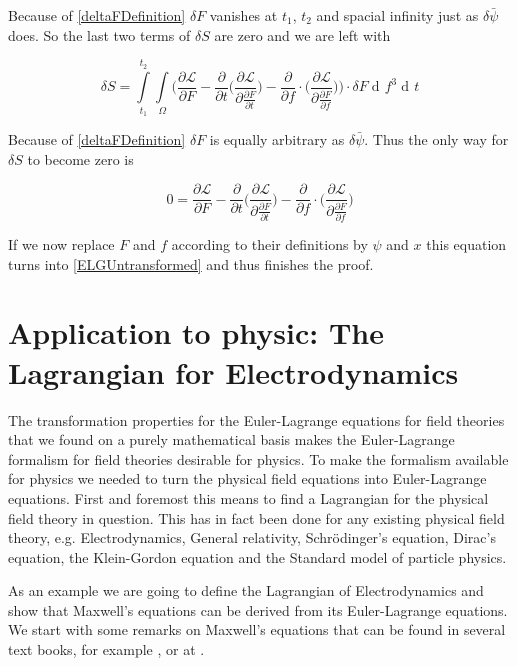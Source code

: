 \documentclass{article}
\DeclareMathOperator{\dd}{d\!}
\begin{document}
Because of \ref{deltaFDefinition}
$\delta F$ vanishes at $t_1$, $t_2$ and spacial infinity just as $\delta \bar{\psi}$ does. So the last two terms of $\delta S$ are zero and we are left with

\begin{equation}
\delta S = \int\limits_{t_1}^{t_2} \int\limits_{\Omega} 
\bigg(
\frac{\partial \mathcal{L}}{\partial F}
-\frac{\partial}{\partial t} \bigg( \frac{\partial \mathcal{L}}{\partial \frac{\partial F}{\partial t}} \bigg) 
-\frac{\partial}{\partial f} \cdot \bigg( \frac{\partial \mathcal{L}}{\partial \frac{\partial F}{\partial f}} \bigg)\bigg) \cdot \delta F
\dd f^3 \dd t
\end{equation}

Because of \ref{deltaFDefinition} $\delta F$ is equally arbitrary as $\delta \bar{\psi}$. Thus the only way for $\delta S$ to become zero is

\begin{equation}
0 = 
\frac{\partial \mathcal{L}}{\partial F}
-\frac{\partial}{\partial t} \bigg( \frac{\partial \mathcal{L}}{\partial \frac{\partial F}{\partial t}} \bigg) 
-\frac{\partial}{\partial f} \cdot \bigg( \frac{\partial \mathcal{L}}{\partial \frac{\partial F}{\partial f}} \bigg)
\end{equation}

If we now replace $F$ and $f$ according to their definitions by $\psi$ and $x$ this equation turns into \ref{ELGUntransformed} and thus finishes the proof.



\section{Application to physic: The Lagrangian for Electrodynamics}
The transformation properties for the Euler-Lagrange equations for field theories that we found on a purely mathematical basis makes the Euler-Lagrange formalism for field theories desirable for physics. To make the formalism available for physics we needed to turn the physical field equations into Euler-Lagrange equations. First and foremost this means to find a Lagrangian for the physical field theory in question. This has in fact been done for any existing physical field theory, e.g. Electrodynamics, General relativity, Schr\"odinger's equation, Dirac's equation, the Klein-Gordon equation and the Standard model of particle physics.

As an example we are going to define the Lagrangian of Electrodynamics and show that Maxwell's equations can be derived from its Euler-Lagrange equations. We start with some remarks on Maxwell's equations that can be found in several text books, for example \cite{Jackson}, or at \cite{Stackexchange}.
\end{document}
